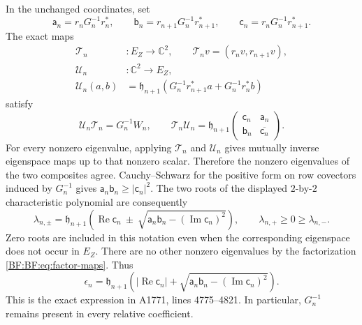 In the unchanged coordinates, set
\begin{equation}
\mathsf a_n=r_nG_n^{-1}r_n^*,\qquad
\mathsf b_n=r_{n+1}G_n^{-1}r_{n+1}^*,\qquad
\mathsf c_n=r_nG_n^{-1}r_{n+1}^*.
\tag{BF.19}\label{BF:BF:eq:abc}
\end{equation}
The exact maps
\begin{equation}
\begin{split}
\mathcal T_n&:E_Z\longrightarrow\mathbb C^2,
\qquad\mathcal T_nv=(r_nv,r_{n+1}v),\\
\mathcal U_n&:\mathbb C^2\longrightarrow E_Z,\\
\mathcal U_n(a,b)
 &=\mathfrak h_{n+1}
    \left(G_n^{-1}r_{n+1}^*a+G_n^{-1}r_n^*b\right)
\end{split}
\tag{BF.20}\label{BF:BF:eq:factor-maps}
\end{equation}
satisfy
\[
\mathcal U_n\mathcal T_n=G_n^{-1}W_n,\qquad
\mathcal T_n\mathcal U_n
=\mathfrak h_{n+1}
  \begin{pmatrix}
   \mathsf c_n&\mathsf a_n\\
   \mathsf b_n&\overline{\mathsf c_n}
  \end{pmatrix}.
\]
For every nonzero eigenvalue, applying \(\mathcal T_n\) and
\(\mathcal U_n\) gives mutually inverse eigenspace maps up to that
nonzero scalar.  Therefore the nonzero eigenvalues of the two
composites agree.  Cauchy--Schwarz for the positive form on row
covectors induced by \(G_n^{-1}\) gives
\(\mathsf a_n\mathsf b_n\ge|\mathsf c_n|^2\).
The two roots of the displayed \(2\)-by-\(2\) characteristic
polynomial are consequently
\begin{equation}
\lambda_{n,\pm}
=\mathfrak h_{n+1}
 \left(\operatorname{Re}\mathsf c_n
 \ \pm\
 \sqrt{\mathsf a_n\mathsf b_n-
               (\operatorname{Im}\mathsf c_n)^2}\right),
\qquad \lambda_{n,+}\ge0\ge\lambda_{n,-}.
\tag{BF.21}\label{BF:BF:eq:two-roots}
\end{equation}
Zero roots are included in this notation even when the corresponding
eigenspace does not occur in \(E_Z\).
There are no other nonzero eigenvalues by the factorization
\eqref{BF:BF:eq:factor-maps}.  Thus
\begin{equation}
\epsilon_n=\mathfrak h_{n+1}
\left(
 |\operatorname{Re}\mathsf c_n|
 +\sqrt{\mathsf a_n\mathsf b_n-
                  (\operatorname{Im}\mathsf c_n)^2}
\right).
\tag{BF.22}\label{BF:BF:eq:explicit-excess}
\end{equation}
This is the exact expression in A1771, lines 4775--4821.
In particular, \(G_n^{-1}\) remains present in every relative
coefficient.

